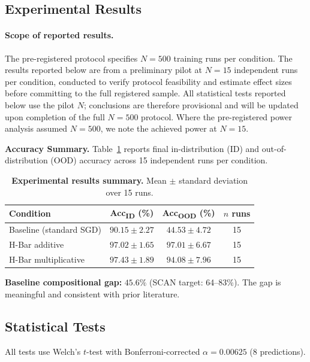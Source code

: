 \documentclass[11pt,a4paper]{article}
\begin{document}
\subsection{Experimental Results}

\paragraph{Scope of reported results.}
The pre-registered protocol specifies $N = 500$ training runs per
condition. The results reported below are from a preliminary pilot at
$N = 15$ independent runs per condition, conducted to verify protocol
feasibility and estimate effect sizes before committing to the full
registered sample. All statistical tests reported below use the pilot
$N$; conclusions are therefore provisional and will be updated upon
completion of the full $N = 500$ protocol. Where the pre-registered
power analysis assumed $N = 500$, we note the achieved power at
$N = 15$.

\textbf{Accuracy Summary.} Table~\ref{tab:results-summary} reports
final in-distribution (ID) and out-of-distribution (OOD) accuracy
across 15 independent runs per condition.

\begin{table}[htbp]
\centering
\caption{\textbf{Experimental results summary.} Mean $\pm$ standard
deviation over 15 runs.}
\label{tab:results-summary}
\begin{tabular}{l c c c}
\toprule
\textbf{Condition} & \textbf{Acc\textsubscript{ID} (\%)} & \textbf{Acc\textsubscript{OOD} (\%)} & \textbf{$n$ runs} \\
\midrule
Baseline (standard SGD) & $90.15 \pm 2.27$ & $44.53 \pm 4.72$ & 15 \\
H-Bar additive & $97.02 \pm 1.65$ & $97.01 \pm 6.67$ & 15 \\
H-Bar multiplicative & $97.43 \pm 1.89$ & $94.08 \pm 7.96$ & 15 \\
\bottomrule
\end{tabular}
\end{table}

\textbf{Baseline compositional gap:} $45.6\%$ (SCAN target: 64--83\%).
The gap is meaningful and consistent with prior literature.

\subsection{Statistical Tests}

All tests use Welch's $t$-test with Bonferroni-corrected
$\alpha = 0.00625$ (8 predictions).
\end{document}
